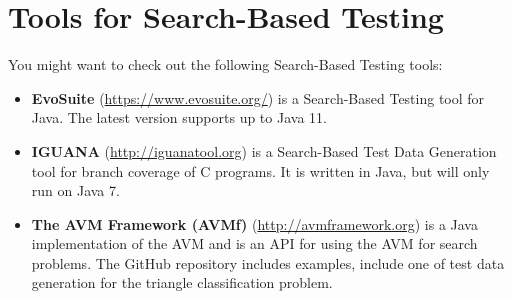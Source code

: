 \section{Tools for Search-Based Testing}

You might want to check out the following Search-Based Testing tools:

\begin{itemize}

    \item {\bf EvoSuite} (\url{https://www.evosuite.org/}) is a Search-Based
    Testing tool for Java. The latest version supports up to Java 11.

    \item {\bf IGUANA} (\url{http://iguanatool.org}) is a Search-Based Test Data
    Generation tool for branch coverage of C programs. It is written in Java,
    but will only run on Java 7.

    \item {\bf The AVM Framework (AVMf)} (\url{http://avmframework.org}) is a
    Java implementation of the AVM and is an API for using the AVM for search
    problems. The GitHub repository includes examples, include one of test data
    generation for the triangle classification problem.

\end{itemize}

